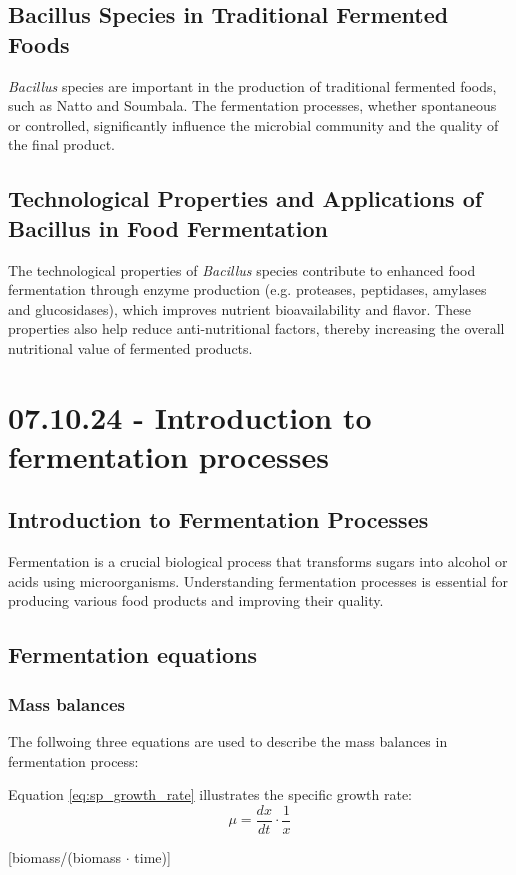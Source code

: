 \subsection{Bacillus Species in Traditional Fermented Foods}
\textit{Bacillus} species are important in the production of traditional fermented foods, such as Natto and Soumbala. The fermentation processes, whether spontaneous or controlled, significantly influence the microbial community and the quality of the final product.

\subsection{Technological Properties and Applications of Bacillus in Food Fermentation}
The technological properties of \textit{Bacillus} species contribute to enhanced food fermentation through enzyme production (e.g. proteases, peptidases, amylases and glucosidases), which improves nutrient bioavailability and flavor. These properties also help reduce anti-nutritional factors, thereby increasing the overall nutritional value of fermented products.

\section{07.10.24 - Introduction to fermentation processes}
\subsection{Introduction to Fermentation Processes}
Fermentation is a crucial biological process that transforms sugars into alcohol or acids using microorganisms. Understanding fermentation processes is essential for producing various food products and improving their quality.

\subsection{Fermentation equations}
\subsubsection*{Mass balances}
The follwoing three equations are used to describe the mass balances in fermentation process:

Equation \ref*{eq:sp_growth_rate} illustrates the specific growth rate:
\begin{equation}
    \mu = \frac{dx}{dt} \cdot \frac{1}{x}
    \label{eq:sp_growth_rate}
\end{equation}
\begin{center}
    \footnotesize{[biomass/(biomass $\cdot$ time)]}
\end{center}

